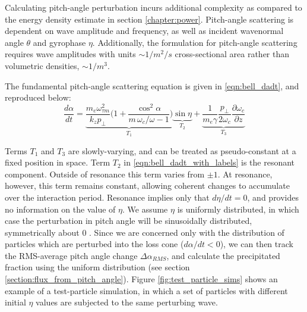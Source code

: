 Calculating pitch-angle perturbation incurs additional complexity as compared to the energy density estimate in section \ref{chapter:power}. Pitch-angle scattering is dependent on wave amplitude and frequency, as well as incident wavenormal angle $\theta$ and gyrophase $\eta$. Additionally, the formulation for pitch-angle scattering requires wave amplitudes with units $\sim 1/m^2/s$ cross-sectional area rather than volumetric densities, $\sim 1/m^3$.

The fundamental pitch-angle scattering equation is given in \eqref{eqn:bell_dadt}, and reproduced below:
\begin{equation}
\frac{d\alpha}{dt} = \underbrace{\frac{m_e \omega_{\tau m}^2}{k_z p_\perp} \bigg( 1 + \frac{\cos^2\alpha}{m\,\omega_c / \omega - 1}\bigg)}_{T_1}\underbrace{\sin \eta}_{T_2} + \underbrace{\frac{1}{m_e \gamma}\frac{p_\perp}{2 \omega_c}\frac{\partial \omega_c}{\partial z}}_{T_3}
\label{eqn:bell_dadt_with_labels}
\end{equation}

Terms $T_1$ and $T_3$ are slowly-varying, and can be treated as pseudo-constant at a fixed position in space. Term $T_2$ in \eqref{eqn:bell_dadt_with_labels} is the resonant component. Outside of resonance this term varies from $\pm 1$. At resonance, however, this term remains constant, allowing coherent changes to accumulate over the interaction period. Resonance implies only that $d\eta/dt = 0$, and provides no information on the value of $\eta$. We assume $\eta$ is uniformly distributed, in which case the perturbation in pitch angle will be sinusoidally distributed, symmetrically about 0 \citep{Inan1977}. Since we are concerned only with the distribution of particles which are perturbed into the loss cone ($d\alpha/dt < 0$), we can then track the RMS-average pitch angle change $\Delta \alpha_{RMS}$, and calculate the precipitated fraction using the uniform distribution (see section \ref{section:flux_from_pitch_angle}).
Figure \ref{fig:test_particle_sims} shows an example of a test-particle simulation, in which a set of particles with different initial $\eta$ values are subjected to the same perturbing wave.

